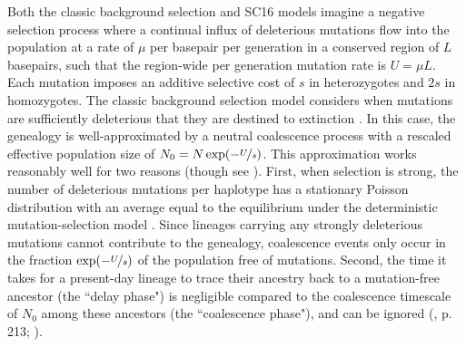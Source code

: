 \documentclass[11pt]{article}
\begin{document}
Both the classic background selection and SC16 models imagine a negative
selection process where a continual influx of deleterious mutations flow into
the population at a rate of $\mu$ per basepair per generation in a conserved
region of $L$ basepairs, such that the region-wide per generation mutation rate
is $U = \mu L$. Each mutation imposes an additive selective cost of $s$ in
heterozygotes and $2s$ in homozygotes. The classic background selection model
considers when mutations are sufficiently deleterious that they are destined to
extinction
\parencite{Charlesworth1993-gb,Nordborg1996-nq,Hudson1995-pt,Hudson1994-oh}. In
this case, the genealogy is well-approximated by a neutral coalescence process
with a rescaled effective population size of $N_0 = N \exp(-\nicefrac{U}{s})$.
This approximation works reasonably well for two reasons (though see
\cite{Cvijovic2018-vd,Walczak2012-fi,Nicolaisen2012-vs}). First, when selection
is strong, the number of deleterious mutations per haplotype has a stationary
Poisson distribution with an average equal to the equilibrium under the
deterministic mutation-selection model \parencite{Haldane1927-ga}. Since
lineages carrying any strongly deleterious mutations cannot contribute to the
genealogy, coalescence events only occur in the fraction
$\exp(-\nicefrac{U}{s})$ of the population free of mutations. Second, the time
it takes for a present-day lineage to trace their ancestry back to a
mutation-free ancestor (the ``delay phase") is negligible compared to the
coalescence timescale of $N_0$ among these ancestors (the ``coalescence
phase"), and can be ignored (\cite{Durrett2008-ql}, p. 213;
\cite{Good2014-yz}).
\end{document}
